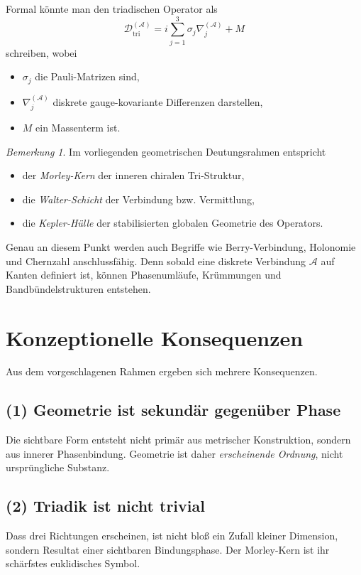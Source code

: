 \documentclass[11pt,a4paper]{article}
\theoremstyle{remark}
\newtheorem{bemerkung}[definition]{Bemerkung}
\newcommand{\Dcal}{\mathcal{D}}
\newcommand{\Acal}{\mathcal{A}}
\begin{document}
	Formal könnte man den triadischen Operator als
	\begin{equation}
		\Dcal_{\mathrm{tri}}^{(\Acal)} = i\sum_{j=1}^3 \sigma_j \nabla_j^{(\Acal)} + M
	\end{equation}
	schreiben, wobei
	\begin{itemize}
		\item $\sigma_j$ die Pauli-Matrizen sind,
		\item $\nabla_j^{(\Acal)}$ diskrete gauge-kovariante Differenzen darstellen,
		\item $M$ ein Massenterm ist.
	\end{itemize}
	
	\begin{bemerkung}
		Im vorliegenden geometrischen Deutungsrahmen entspricht
		\begin{itemize}
			\item der \emph{Morley-Kern} der inneren chiralen Tri-Struktur,
			\item die \emph{Walter-Schicht} der Verbindung bzw. Vermittlung,
			\item die \emph{Kepler-Hülle} der stabilisierten globalen Geometrie des Operators.
		\end{itemize}
	\end{bemerkung}
	
	Genau an diesem Punkt werden auch Begriffe wie Berry-Verbindung, Holonomie und Chernzahl anschlussfähig. Denn sobald eine diskrete Verbindung $\Acal$ auf Kanten definiert ist, können Phasenumläufe, Krümmungen und Bandbündelstrukturen entstehen.
	

	
	\section{Konzeptionelle Konsequenzen}
	
	Aus dem vorgeschlagenen Rahmen ergeben sich mehrere Konsequenzen.
	
	\subsection*{(1) Geometrie ist sekundär gegenüber Phase}
	Die sichtbare Form entsteht nicht primär aus metrischer Konstruktion, sondern aus innerer Phasenbindung. Geometrie ist daher \emph{erscheinende Ordnung}, nicht ursprüngliche Substanz.
	
	\subsection*{(2) Triadik ist nicht trivial}
	Dass drei Richtungen erscheinen, ist nicht bloß ein Zufall kleiner Dimension, sondern Resultat einer sichtbaren Bindungsphase. Der Morley-Kern ist ihr schärfstes euklidisches Symbol.
	
\end{document}
